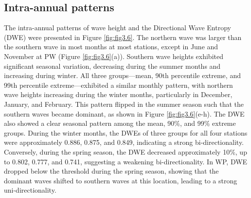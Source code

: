 \subsection{Intra-annual patterns}
\label{Intra-annual patterns}
The intra-annual patterns of wave height and the Directional Wave Entropy (DWE) were presented in Figure \ref{fig:fig3.6}. The northern wave was larger than the southern wave in most months at most stations, except in June and November at PW (Figure \ref{fig:fig3.6}(a)). Southern wave heights exhibited significant seasonal variation, decreasing during the summer months and increasing during winter. All three groups—mean, 90th percentile extreme, and 99th percentile extreme—exhibited a similar monthly pattern, with northern wave heights increasing during the winter months, particularly in December, January, and February. This pattern flipped in the summer season such that the southern waves became dominant, as shown in Figure \ref{fig:fig3.6}(e-h). The DWE also showed a clear seasonal pattern among the mean, 90\%, and 99\% extreme groups. During the winter months, the DWEs of three groups for all four stations were approximately 0.886, 0.875, and 0.849, indicating a strong bi-directionality. Conversely, during the spring season, the DWE decreased approximately 10\%, up to 0.802, 0.777, and 0.741, suggesting a weakening bi-directionality. In WP, DWE dropped below the threshold during the spring season, showing that the dominant waves shifted to southern waves at this location, leading to a strong uni-directionality.  

